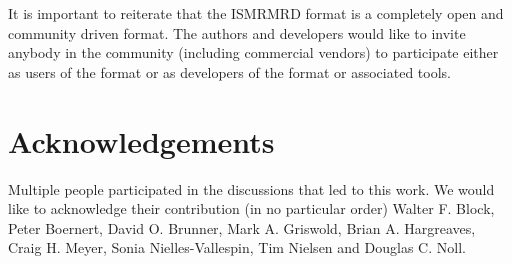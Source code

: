 \documentclass[12pt]{article}
\begin{document}
It is important to reiterate that the ISMRMRD format is a completely open and community driven format. The authors and developers would like to invite anybody in the community (including commercial vendors) to participate either as users of the format or as developers of the format or associated tools.

\section*{Acknowledgements}
Multiple people participated in the discussions that led to this work.  We would like to acknowledge their contribution (in no particular order) 
Walter F. Block,
Peter Boernert,
David O. Brunner,
Mark A. Griswold,
Brian A. Hargreaves,
Craig H. Meyer,
Sonia Nielles-Vallespin,
Tim Nielsen and 
Douglas C. Noll.



\end{document}
